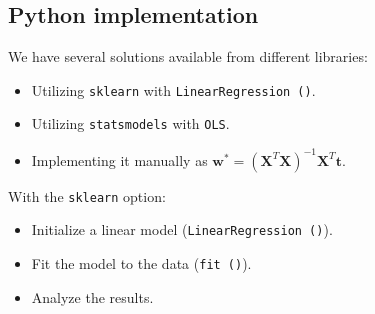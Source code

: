 \subsection{Python implementation}
We have several solutions available from different libraries:
\begin{itemize}
    \item Utilizing \texttt{sklearn} with \texttt{LinearRegression ()}.
    \item Utilizing \texttt{statsmodels} with \texttt{OLS}.
    \item Implementing it manually as $\textbf{w}^\ast={\left(\textbf{X}^T\textbf{X}\right)}^{-1}\textbf{X}^T\textbf{t}$.
\end{itemize}
With the \texttt{sklearn} option:
\begin{itemize}
    \item Initialize a linear model (\texttt{LinearRegression ()}).
    \item Fit the model to the data (\texttt{fit ()}).
    \item Analyze the results.
\end{itemize}